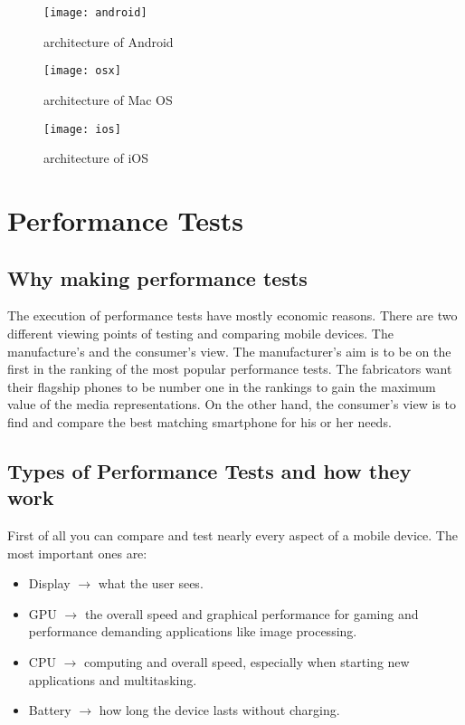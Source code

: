 \documentclass[conference, 11pt]{IEEEtran}
\begin{document}
\begin{figure}[htbp]
\centerline{\texttt{[image: android]}}
\caption{architecture of Android\cite{silberschatz}}
\label{Figure 1}
\end{figure}

\begin{figure}[htbp]
\centerline{\texttt{[image: osx]}}
\caption{architecture of Mac OS \cite{silberschatz}}
\label{Figure 2}
\end{figure}

\begin{figure}[htbp]
\centerline{\texttt{[image: ios]}}
\caption{architecture of iOS \cite{silberschatz}}
\label{Figure 2.1}
\end{figure}

\section{Performance Tests}
\subsection{Why making performance tests}
The execution of performance tests have mostly economic reasons.
There are two different viewing points of testing and comparing mobile devices. The manufacture’s and the consumer’s view. The manufacturer’s aim is to be on the first in the ranking of the most popular performance tests. The fabricators want their flagship phones to be number one in the rankings to gain the maximum value of the media representations. 
On the other hand, the consumer’s view is to find and compare the best matching smartphone for his or her needs.

\subsection{Types of Performance Tests and how they work}
First of all you can compare and test nearly every aspect of a mobile device. \newline
The most important ones are: 
\begin{itemize}
\item Display $\rightarrow$ what the user sees.
\item GPU $\rightarrow$ the overall speed and graphical performance for gaming and performance demanding applications like image processing.
\item CPU $\rightarrow$  computing and overall speed, especially when starting new applications and multitasking.
\item Battery $\rightarrow$  how long the device lasts without charging.
\end{itemize}
\end{document}
